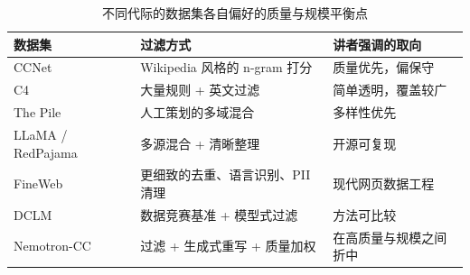 \begin{table}[H]
\centering
\begin{tabular}{p{}p{}p{}}
\toprule
\textbf{数据集} & \textbf{过滤方式} & \textbf{讲者强调的取向} \\
\midrule
CCNet & Wikipedia 风格的 n-gram 打分 & 质量优先，偏保守 \\
C4 & 大量规则 + 英文过滤 & 简单透明，覆盖较广 \\
The Pile & 人工策划的多域混合 & 多样性优先 \\
LLaMA / RedPajama & 多源混合 + 清晰整理 & 开源可复现 \\
FineWeb & 更细致的去重、语言识别、PII 清理 & 现代网页数据工程 \\
DCLM & 数据竞赛基准 + 模型式过滤 & 方法可比较 \\
Nemotron-CC & 过滤 + 生成式重写 + 质量加权 & 在高质量与规模之间折中 \\
\bottomrule
\end{tabular}
\caption{不同代际的数据集各自偏好的质量与规模平衡点}
\end{table}

